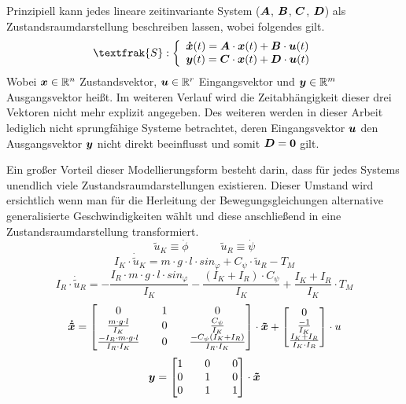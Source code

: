 Prinzipiell kann jedes lineare zeitinvariante System ($\boldsymbol{A}$, $\boldsymbol{B}$, $\boldsymbol{C}$, $\boldsymbol{D}$) als Zustandsraumdarstellung beschreiben lassen, wobei folgendes gilt.
\begin{equation}
\textfrak{S} : \left\{ \begin{array}{ll}
\bs{\dot{x}}(t) = \bs{A}\cdot \bs{x}(t) + \bs{B}\cdot \bs{u}(t) \\
\bs{y}(t) = \bs{C}\cdot \bs{x}(t) + \bs{D}\cdot \bs{u}(t)
\end{array}
\right.
\end{equation}
Wobei $\boldsymbol{x} \in \mathbb{R}^n$ Zustandsvektor, $\boldsymbol{u} \in \mathbb{R}^r$ Eingangsvektor und $\boldsymbol{y} \in \mathbb{R}^m$ Ausgangsvektor heißt. Im weiteren Verlauf wird die Zeitabhängigkeit dieser drei Vektoren nicht mehr explizit angegeben. Des weiteren werden in dieser Arbeit lediglich nicht sprungfähige Systeme  betrachtet, deren Eingangsvektor $\boldsymbol{u}$  den Ausgangsvektor $\boldsymbol{y}$ nicht direkt beeinflusst und somit $\boldsymbol{D} = \boldsymbol{0}$ gilt.

Ein großer Vorteil dieser Modellierungsform besteht darin, dass für jedes Systems unendlich viele Zustandsraumdarstellungen existieren. Dieser Umstand wird ersichtlich wenn man für die Herleitung der Bewegungsgleichungen alternative generalisierte Geschwindigkeiten wählt und diese anschließend in eine Zustandsraumdarstellung transformiert.
\begin{equation}
\tilde{u}_K \equiv \dot{\phi} \hspace{35pt} \tilde{u}_R \equiv \dot{\psi}
\end{equation}
\begin{equation}
I_K\cdot \dot{\tilde{u}}_K = m\cdot g \cdot l \cdot sin_{\varphi} + C_{\psi}\cdot \tilde{u}_R - T_M
\end{equation}
\begin{equation}
I_R\cdot \dot{\tilde{u}}_R = -\frac{I_R\cdot m\cdot g\cdot l\cdot sin_{\varphi}}{I_K} - \frac{(I_K + I_R)\cdot C_{\psi}}{I_K} + \frac{I_K + I_R}{I_K}\cdot T_M
\end{equation}
\begin{equation}
\boldsymbol{\dot{\tilde{x}}} = \begin{bmatrix}
0 && 1 && 0 
\\
\frac{m\cdot g\cdot l}{I_K} && 0 && \frac{C_{\psi}}{I_K}
\\
\frac{-I_R\cdot m\cdot g\cdot l}{I_R\cdot I_K} && 0 && \frac{-C_{\psi}(I_K+I_R)}{I_R\cdot I_K} 
\end{bmatrix}\cdot \boldsymbol{\tilde{x}}
+
\begin{bmatrix}
0 \\ \frac{-1}{I_K} \\ \frac{I_K+I_R}{I_K\cdot I_R}
\end{bmatrix} \cdot u
\end{equation}
\begin{equation}
\boldsymbol{y} = \begin{bmatrix}
1 && 0 && 0 \\
0 && 1 && 0 \\
0 && 1 && 1 \\
\end{bmatrix} \cdot \boldsymbol{\tilde{x}}
\end{equation}

